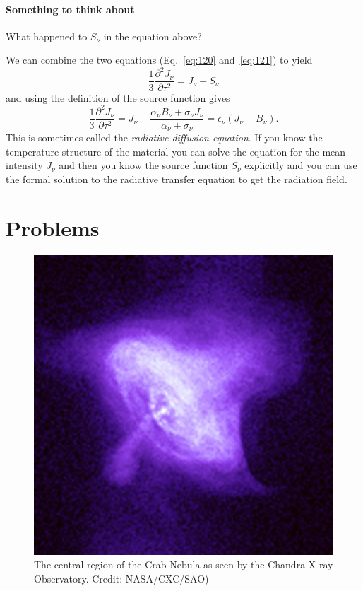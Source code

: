\paragraph{Something to think about}  What happened to $S_\nu$ in the
equation above?

We can combine the two equations (Eq.~\ref{eq:120} and~\ref{eq:121}) to yield
\begin{equation}
 \frac{1}{3} \frac{\partial^2
  J_\nu}{\partial \tau^2} =  J_\nu - S_\nu
\label{eq:122}
\end{equation}
and using the definition of the source function gives
\begin{equation}
 \frac{1}{3} \frac{\partial^2
  J_\nu}{\partial \tau^2} =  J_\nu -  \frac{\alpha_\nu B_\nu +
   \sigma_\nu J_\nu}{\alpha_\nu + \sigma_\nu} = \epsilon_\nu 
\left ( J_\nu - B_\nu \right ).
\label{eq:123}
\end{equation}
This is sometimes called the {\em radiative diffusion equation}.  If
you know the temperature structure of the material you can solve the
equation for the mean intensity $J_\nu$ and then you know the source
function $S_\nu$ explicitly and you can use the formal solution to the
radiative transfer equation to get the radiation field.


\section{Problems}
\begin{figure}
\begin{center}
\includegraphics[width=0.5\columnwidth]{0052_xray_lg.jpg}
\end{center}
\caption{The central region of the Crab Nebula as seen by the Chandra
  X-ray Observatory. Credit: NASA/CXC/SAO)}
\label{fig:crab-xray}
\end{figure}

